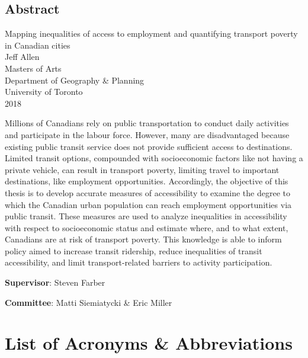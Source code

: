 \documentclass[11 pt, letterpaper]{article}
\begin{document}
{
\begin{center}
\section*{Abstract}
	\singlespacing
	{Mapping inequalities of access to employment and quantifying transport poverty in Canadian cities}\\[2ex]
	{Jeff Allen}\\
	{Masters of Arts}\\
	Department of Geography \& Planning\\
	University of Toronto\\
	{2018}\\
\end{center}
Millions of Canadians rely on public transportation to conduct daily activities and participate in the labour force. However, many are disadvantaged because existing public transit service does not provide sufficient access to destinations. Limited transit options, compounded with socioeconomic factors like not having a private vehicle, can result in transport poverty, limiting travel to important destinations, like employment opportunities. Accordingly, the objective of this thesis is to develop accurate measures of accessibility to examine the degree to which the Canadian urban population can reach employment opportunities via public transit. These measures are used to analyze inequalities in accessibility with respect to socioeconomic status and estimate where, and to what extent, Canadians are at risk of transport poverty. This knowledge is able to inform policy aimed to increase transit ridership, reduce inequalities of transit accessibility, and limit transport-related barriers to activity participation.

\vspace{12mm}

\textbf{Supervisor}: Steven Farber 
	
\textbf{Committee}: Matti Siemiatycki \& Eric Miller


\newpage



\tableofcontents

\newpage

\listoffigures


\newpage

\listoftables




\newpage

\section*{List of Acronyms \& Abbreviations}

}
\end{document}
